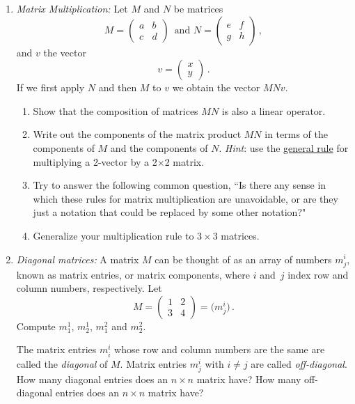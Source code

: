 \begin{enumerate}
\item\label{matmult} {\itshape Matrix Multiplication:} 
Let $M$ and $N$ be matrices
\[
M=    \begin{pmatrix}
      a             &b  \\
      c             &d
    \end{pmatrix}\, \mbox{ and }
    N=    \begin{pmatrix}
       e            &f  \\
       g            &h
    \end{pmatrix}\, ,
\]
and $v$ the vector
\[
v=    \begin{pmatrix}
      x               \\
      y             \end{pmatrix}\, .
\]
If we first apply $N$ and then $M$ to $v$ we obtain the vector $MNv$.\\
\begin{enumerate}
\item Show that the composition of matrices $MN$ is also a linear operator.\\
\item Write out the components of the matrix product $MN$ in terms of the components of $M$ and the components of $N$.
{\itshape Hint}: use the \hyperlink{ch1vecmult}{general rule} for multiplying a 2-vector by a 2$\times$2 matrix. 
\item Try to answer the following common question, ``Is there any sense in which these rules for matrix multiplication are unavoidable, or are they just a notation that could be replaced by some other notation?"
\item Generalize your multiplication rule to $3\times 3$ matrices.
\end{enumerate}

\item {\itshape \hypertarget{diagmat}{Diagonal} matrices:} A matrix $M$ can be thought of as an array of numbers $m^i_j$, known as matrix entries, or matrix components,  where $i$ and~$j$ index row and column numbers, respectively. Let 
\[
M=\begin{pmatrix}1&2\\3&4\end{pmatrix}=\big(m^i_j\big)\, .
\]
Compute $m^1_1$, $m^1_2$, $m^2_1$ and $m^2_2$. 

\noindent
The matrix entries $m^i_i$ whose row and column numbers are the same are called the {\itshape diagonal}
of $M$. Matrix entries $m^i_j$ with $i\neq j$ are called {\itshape off-diagonal}. How many diagonal entries does an $n\times n$ matrix have? How many off-diagonal 
entries does an $n\times n$ matrix have?


\end{enumerate}
